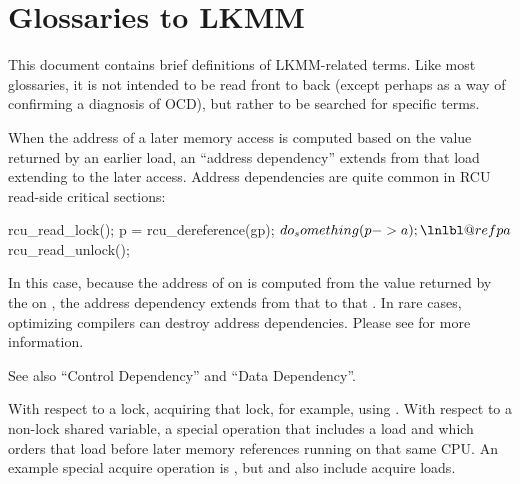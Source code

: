 \chapter{Glossaries to LKMM}

This document contains brief definitions of LKMM-related terms.
Like most glossaries, it is not intended to be read front to back
(except perhaps as a way of confirming a diagnosis of OCD), but rather
to be searched for specific terms.

\begin{description}[style=nextline]
  \item[Address Dependency:]
	When the address of a later memory access is computed
	based on the value returned by an earlier load, an ``address
	dependency'' extends from that load extending to the later access.
	Address dependencies are quite common in RCU read-side critical
	sections:

\begin{fcvlabel}
\begin{VerbatimN}[commandchars=\\\@\$]
	rcu_read_lock();
	p = rcu_dereference(gp);    \lnlbl@rcuderef$
	do_something(p->a);    \lnlbl@refpa$
	rcu_read_unlock();
\end{VerbatimN}
\end{fcvlabel}
        
	\begin{fcvref}
	In this case, because the address of  on 
	is computed from the value returned by the 
	on , the address dependency extends from that
	 to that .
	In rare cases, optimizing compilers can destroy address dependencies.
	Please see 
	for more information.
        \end{fcvref}

	See also ``Control Dependency'' and ``Data Dependency''.

      \item[Acquire:]
	With respect to a lock, acquiring that lock, for example,
	using .
	With respect to a non-lock shared variable, a special operation
	that includes a load and which orders that load before later memory
	references running on that same CPU.
	An example special acquire operation is ,
	but  and 
	also include acquire loads.


\end{description}
